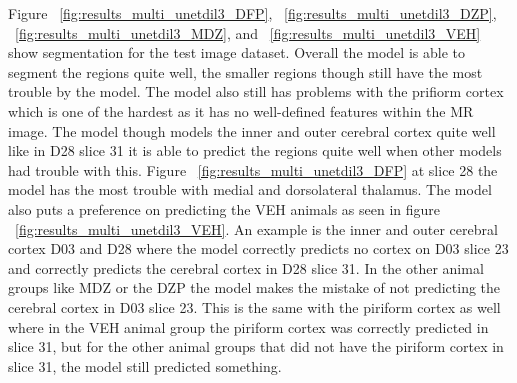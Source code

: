 Figure ~\ref{fig:results_multi_unetdil3_DFP}, ~\ref{fig:results_multi_unetdil3_DZP}, ~\ref{fig:results_multi_unetdil3_MDZ}, and ~\ref{fig:results_multi_unetdil3_VEH} show segmentation for the test image dataset. 
Overall the model is able to segment the regions quite well, the smaller regions though still have the most trouble by the model. 
The model also still has problems with the prifiorm cortex which is one of the hardest as it has no well-defined features within the MR image.
The model though models the inner and outer cerebral cortex quite well like in D28 slice 31 it is able to predict the regions quite well when other models had trouble with this.
Figure ~\ref{fig:results_multi_unetdil3_DFP} at slice 28 the model has the most trouble with medial and dorsolateral thalamus.
The model also puts a preference on predicting the VEH animals as seen in figure ~\ref{fig:results_multi_unetdil3_VEH}.
An example is the inner and outer cerebral cortex D03 and D28 where the model correctly predicts no cortex on D03 slice 23 and correctly predicts the cerebral cortex in D28 slice 31. In the other animal groups like MDZ or the DZP the model makes the mistake of not predicting the cerebral cortex in D03 slice 23. 
This is the same with the piriform cortex as well where in the VEH animal group the piriform cortex was correctly predicted in slice 31, but for the other animal groups that did not have the piriform cortex in slice 31, the model still predicted something.

